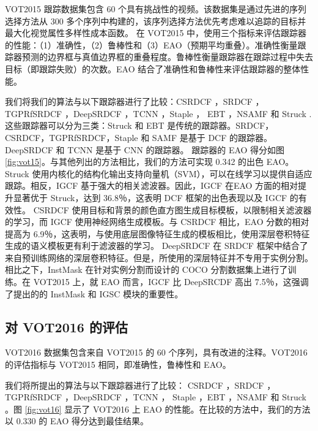 VOT2015 \cite{Kristan2015TheVO} 跟踪数据集包含 60 个具有挑战性的视频。该数据集是通过先进的序列选择方法从 300 多个序列中构建的，该序列选择方法优先考虑难以追踪的目标并最大化视觉属性多样性成本函数。
在 VOT2015 中，使用三个指标来评估跟踪器的性能：（1）准确性，（2）鲁棒性和（3）EAO（预期平均重叠）。准确性衡量跟踪器预测的边界框与真值边界框的重叠程度。鲁棒性衡量跟踪器在跟踪过程中失去目标（即跟踪失败）的次数。EAO 结合了准确性和鲁棒性来评估跟踪器的整体性能。

我们将我们的算法与以下跟踪器进行了比较：CSRDCF \cite{Lukezic2017DiscriminativeCF}，SRDCF \cite{Danelljan2015LearningSR}，TGPRfSRDCF \cite{gao2018tracking}，DeepSRDCF \cite{Danelljan2015ConvolutionalFF}，TCNN \cite{nam2016modeling}，Staple \cite{Bertinetto2016StapleC}， EBT \cite{Zhu2016BeyondLS}，NSAMF \cite{Hua2015OnlineOT} 和 Struck \cite{Hare2011StruckSO}.
这些跟踪器可以分为三类：Struck 和 EBT 是传统的跟踪器。SRDCF，CSRDCF，TGPRfSRDCF，Staple 和 SAMF 是基于 DCF 的跟踪器。DeepSRDCF 和 TCNN 是基于 CNN 的跟踪器。
跟踪器的 EAO 得分如图 \ref{fig:vot15}。与其他列出的方法相比，我们的方法可实现 0.342 的出色 EAO。
Struck 使用内核化的结构化输出支持向量机（SVM），可以在线学习以提供自适应跟踪。相反，IGCF 基于强大的相关滤波器。因此，IGCF 在EAO 方面的相对提升显著优于 Struck，达到 36.8％，这表明 DCF 框架的出色表现以及 IGCF 的有效性。
CSRDCF 使用目标和背景的颜色直方图生成目标模板，以限制相关滤波器的学习，而 IGCF 使用神经网络生成模板。与 CSRDCF 相比，EAO 分数的相对提高为 6.9％，这表明，与使用底层图像特征生成的模板相比，使用深层卷积特征生成的语义模板更有利于滤波器的学习。
DeepSRDCF 在 SRDCF 框架中结合了来自预训练网络的深层卷积特征。但是，所使用的深层特征并不专用于实例分割。相比之下，InstMask 在针对实例分割而设计的 COCO 分割数据集上进行了训练。在 VOT2015 上，就 EAO 而言，IGCF 比 DeepSRCDF 高出 7.5％，这强调了提出的的 InstMask 和 IGSC 模块的重要性。

\subsection{对 VOT2016 的评估}
VOT2016 \cite{Kristan2016TheVO} 数据集包含来自 VOT2015 的 60 个序列，具有改进的注释。VOT2016 的评估指标与 VOT2015 相同，即准确性，鲁棒性和 EAO。

我们将所提出的算法与以下跟踪器进行了比较：
CSRDCF \cite{Lukezic2017DiscriminativeCF}，SRDCF \cite{Danelljan2015LearningSR}，TGPRfSRDCF \cite{gao2018tracking}，DeepSRDCF \cite{Danelljan2015ConvolutionalFF}，TCNN \cite{nam2016modeling}， Staple \cite{Bertinetto2016StapleC}，EBT \cite{Zhu2016BeyondLS}，NSAMF \cite{Hua2015OnlineOT} 和 Struck \cite{Hare2011StruckSO}。图 \ref{fig:vot16} 显示了 VOT2016 上 EAO 的性能。在比较的方法中，我们的方法以 0.330 的 EAO 得分达到最佳结果。

